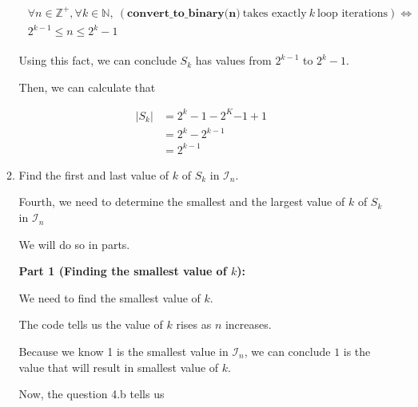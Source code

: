 \documentclass[12pt]{article}
\begin{document}
\begin{enumerate}[a.]
\begin{mdframed}
\begin{enumerate}[1.]
\begin{mdframed}
        \begin{align}
            \begin{split}
            \forall n \in \mathbb{Z}^+, \forall k \in \mathbb{N},\: (\textbf{
            convert\_to\_binary(n)}\:\text{takes exactly}\:k\:\text{loop iterations}) \Leftrightarrow
            \\ 2^{k-1} \leq n \leq 2^k -1
            \end{split}
        \end{align}

        \bigskip

        Using this fact, we can conclude $S_k$ has values from $2^{k-1}$ to $2^k - 1$.

        \bigskip

        Then, we can calculate that

        \begin{align}
            \lvert S_k \rvert &= 2^k -1 - 2^K{-1} + 1\\
            &= 2^k - 2^{k-1}\\
            &= 2^{k-1}
        \end{align}
        \end{mdframed}

        \item Find the first and last value of $k$ of $S_k$ in $\mathcal{I}_n$.

        \begin{mdframed}
        Fourth, we need to determine the smallest and the largest value of $k$
        of $S_k$ in $\mathcal{I}_n$

        \bigskip

        We will do so in parts.

        \bigskip

        \textbf{Part 1 (Finding the smallest value of $k$):}

        \bigskip

        We need to find the smallest value of $k$.

        \bigskip

        The code tells us the value of $k$ rises as $n$ increases.

        \bigskip

        Because we know 1 is the smallest value in $\mathcal{I}_n$, we can conclude
        $1$ is the value that will result in smallest value of $k$.

        \bigskip

        Now, the question 4.b tells us


\end{mdframed}
\end{enumerate}
\end{mdframed}
\end{enumerate}
\end{document}

